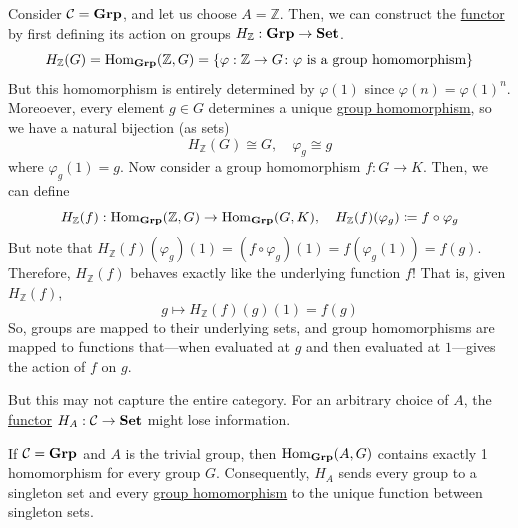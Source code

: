 	\begin{example}[$\Group$ ]
	  \label{ex:group}
		Consider $\mathcal{C} = \operatorname{\mathbf{Grp}}$, and let us choose $A = \mathbb{Z}$. Then, we can construct the \hyperref[def:functor]{functor} by first defining its action on groups $H_{\mathbb{Z}} : \operatorname{\mathbf{Grp}} \to \operatorname{\mathbf{Set}}$. 
		\begin{equation}
			H_{\mathbb{Z}}(G) = \operatorname{Hom}_{\operatorname{\mathbf{Grp}}}(\mathbb{Z}, G) = \{\varphi : \mathbb{Z} \to G \colon \varphi \text{ is a group homomorphism}\}
		\end{equation}
		But this homomorphism is entirely determined by $\varphi(1)$ since $\varphi(n) = \varphi(1)^n$. Moreoever, every element $g \in G$ determines a unique \hyperref[alg-def:group-homomorphism]{group homomorphism}, so we have a natural bijection (as sets) 
		\begin{equation}
			H_{\mathbb{Z}}(G) \cong G, \quad \varphi_g \cong g
		\end{equation}
		where $\varphi_g (1) = g$. Now consider a group homomorphism $f: G \to K$. Then, we can define 
		\begin{equation}
			H_{\mathbb{Z}}(f) : \operatorname{Hom}_{\operatorname{\mathbf{Grp}}}(\mathbb{Z}, G) \to \operatorname{Hom}_{\operatorname{\mathbf{Grp}}}(G, K), \quad H_{\mathbb{Z}}(f)(\varphi_g) \coloneqq f \circ \varphi_g
		\end{equation}
		But note that $H_{\mathbb{Z}} (f) (\varphi_g)(1) = (f \circ \varphi_g)(1) = f(\varphi_g(1)) = f(g)$. Therefore, $H_{\mathbb{Z}}(f)$ behaves exactly like the underlying function $f$! That is, given $H_{\mathbb{Z}} (f)$, 
		\begin{equation}
			g \mapsto H_{\mathbb{Z}} (f)(g)(1) = f(g)
		\end{equation}
		So, groups are mapped to their underlying sets, and group homomorphisms are mapped to functions that---when evaluated at $g$ and then evaluated at $1$---gives the action of $f$ on $g$. 
	\end{example}

	But this may not capture the entire category. For an arbitrary choice of $A$, the \hyperref[def:functor]{functor} $H_A: \mathcal{C} \to \operatorname{\mathbf{Set}}$ might lose information. 

	\begin{example}
	  \label{ex:the-trivial-group-as-an-initial-object}
		If $\mathcal{C} = \operatorname{\mathbf{Grp}}$ and $A$ is the trivial group, then $\operatorname{Hom}_{\operatorname{\mathbf{Grp}}}(A, G)$ contains exactly 1 homomorphism for every group $G$. Consequently, $H_A$ sends every group to a singleton set and every \hyperref[alg-def:group-homomorphism]{group homomorphism} to the unique function between singleton sets. 
	\end{example}

